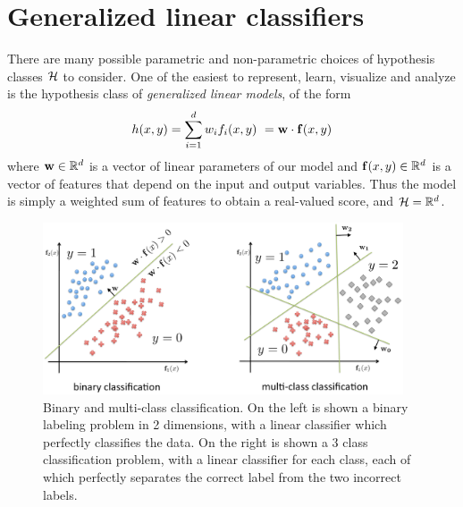

\section{Generalized linear classifiers}\label{sec:glms}
There are many possible parametric and non-parametric choices of hypothesis 
classes $\mathcal{H}$ to consider.  One of the easiest to represent, learn, visualize 
and analyze is the hypothesis class of {\em generalized linear models}, of the 
form
\begin{equation}
h(x,y) = \sum_{i=1}^d w_i f_i(x,y)\ = \mathbf{w} \cdot \mathbf{f}(x,y) \end{equation}
where $\mathbf{w} \in \mathbb{R}^d$ is a vector of linear parameters of our model and 
$\mathbf{f}(x,y) \in \mathbb{R}^d$ is a vector of features that depend on the input and 
output variables.  Thus the model is simply a weighted sum of features to 
obtain a real-valued score, and $\mathcal{H} = \mathbb{R}^d$.


\begin{figure}[tb]
\begin{center}
\includegraphics[width=0.95\textwidth]{figs/binary-multiclass-ml.pdf}
\caption[Binary and multi-class linear classification.]{Binary and multi-class classification.  On the left is shown a binary labeling problem in 2 dimensions, with a linear classifier which perfectly classifies the data.  On the right is shown a 3 class classification problem, with a linear classifier for each class, each of which perfectly separates the correct label from the two incorrect labels.}
\label{fig:binary-multiclass-ml}
\end{center}
\end{figure}


